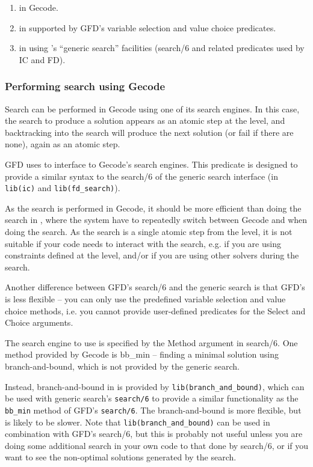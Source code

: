 \begin{enumerate}
\item in Gecode. 
\item in \eclipse supported by GFD's variable selection 
and value choice predicates. 
\item in \eclipse using \eclipse's ``generic search'' 
facilities (search/6 and related predicates used by IC and FD). 
\end{enumerate}

\subsubsection{Performing search using Gecode}
\label{searcheng}
Search can be performed in Gecode using one of its search engines. 
In this 
case, the search to produce a solution appears as an atomic step at
the \eclipse level, and backtracking into the search will produce the next 
solution (or fail if there are none), again as an atomic step.

GFD uses 
to interface to Gecode's search engines. This predicate is
designed to provide a similar syntax to the search/6 of the generic search 
interface (in {\tt lib(ic)} and {\tt lib(fd_search)}). 

As the search is performed in Gecode, it should be more efficient than doing
the search in \eclipse, where the system have to repeatedly switch between
Gecode and \eclipse when doing the search. As the search is a single atomic
step from the \eclipse level, it is not suitable if your code needs to
interact with the search, e.g. if you are using constraints defined at the
\eclipse level, and/or if you are using other solvers during the search.

Another difference between GFD's search/6 and the generic search is that 
GFD's is  less flexible -- you can only use the predefined variable 
selection and value choice methods, i.e. you cannot provide user-defined
predicates for the Select and Choice arguments. 

The search engine to use is specified by the Method argument in search/6. 
One method provided by Gecode is bb_min -- finding a minimal solution using
branch-and-bound, which is not provided by the generic search. 

Instead, branch-and-bound in \eclipse is provided by {\tt lib(branch_and_bound)}, which can
be used with generic search's {\tt search/6} to provide a similar functionality as
the {\tt bb_min} method of GFD's {\tt search/6}. The \eclipse branch-and-bound is more 
flexible, but is likely to be slower. Note that {\tt lib(branch_and_bound)} can
be used in combination with GFD's search/6, but this is probably not useful
unless you are doing some additional search in your own code to that done by 
search/6, or if you want to see the non-optimal solutions generated by the
search.

